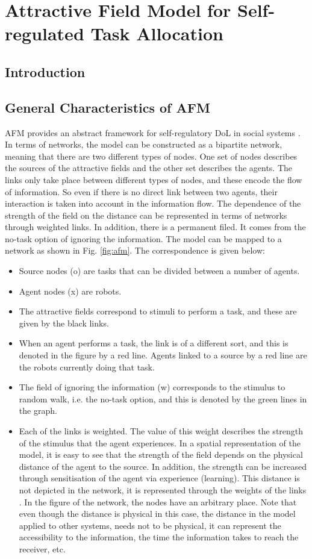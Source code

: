 \chapter{Attractive Field Model for Self-regulated Task Allocation}
\section{Introduction}

\section{General Characteristics of AFM}
AFM provides an abstract framework for self-regulatory DoL in social systems \cite{Elsa}. In terms of networks, the model can be constructed as a bipartite network, meaning that there are two different types of nodes. One set of nodes describes the sources of the attractive fields and the other set describes the agents. The links only take place between different types of nodes, and these encode the flow of information. So even if there is no direct link between two agents, their interaction is taken into account in the information flow. The dependence of the strength of the field on the distance can be represented in terms of networks through weighted links. In addition, there is a permanent filed. It comes from the no-task option of ignoring the information. The model can be mapped to a network as shown in Fig. \ref{fig:afm}. The correspondence is given below:
\begin{itemize}
\item Source nodes (o) are tasks that can be divided between a number of agents.
\item Agent nodes (x) are robots.
\item The attractive fields correspond to stimuli to perform a task, and these are given by the black links.
\item When an agent performs a task, the link is of a different sort, and this is denoted in the figure by a red line. Agents linked to a source by a red line are the robots currently doing that task. 
\item The field of ignoring the information (w) corresponds to the stimulus to random walk, i.e. the no-task option, and this is denoted by the green lines in the graph. 
\item Each of the links is weighted. The value of this weight describes the strength of the stimulus that the agent experiences. In a spatial representation of the model, it is easy to see that the strength of the field depends on the physical distance of the agent to the source. In addition, the strength can be increased through sensitisation of the agent via experience (learning). This distance is not depicted in the network, it is represented through the weights of the links . In the figure of the network, the nodes have an arbitrary place. Note that even though the distance is physical in this case, the distance in the model applied to other systems, needs not to be physical, it can represent the accessibility to the information, the time the information takes to reach the receiver, etc. 
\end{itemize}
